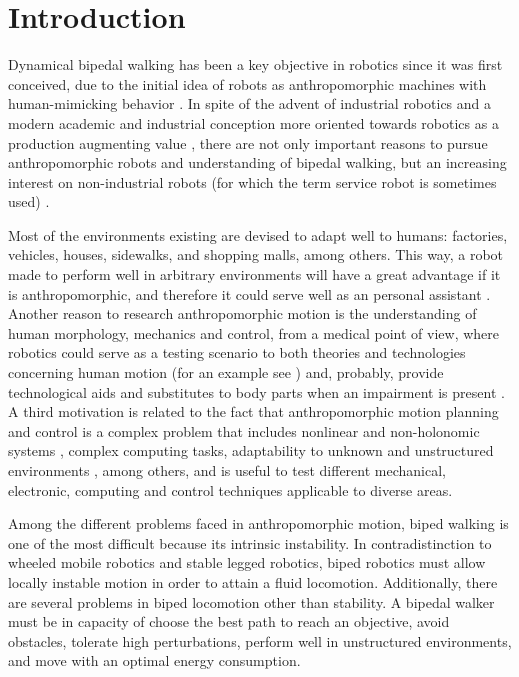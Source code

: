 \section{Introduction}
Dynamical bipedal walking has been a key objective in robotics since
it was first conceived, due to the initial idea of robots as
anthropomorphic machines with human-mimicking behavior
\cite{Capek3R.U.R.}. In spite of the advent of industrial robotics and
a modern academic and industrial conception more oriented towards
robotics as a production augmenting value \cite{Yonemoto85TECHNOLOGY},
there are not only important reasons to pursue anthropomorphic robots
and understanding of bipedal walking, but an increasing interest on
non-industrial robots (for which the term service robot is sometimes
used) \cite{Asami94Robots}.


Most of the environments existing are devised to adapt well to humans:
factories, vehicles, houses, sidewalks, and shopping malls, among
others. This way, a robot made to perform well in arbitrary
environments will have a great advantage if it is anthropomorphic, and
therefore it could serve well as an personal assistant
\cite{Dario01Humanoids}. Another reason to research anthropomorphic
motion is the understanding of human morphology, mechanics and
control, from a medical point of view, where robotics could serve as a
testing scenario to both theories and technologies concerning human
motion (for an example see \cite{Woo06Biomechanics}) and, probably,
provide technological aids and substitutes to body parts when an
impairment is present \cite{Hermini01Proposal}. A third motivation is
related to the fact that anthropomorphic motion planning and control
is a complex problem that includes nonlinear and non-holonomic systems
\cite{Basdogan96Nonlinear}, complex computing tasks, adaptability to
unknown and unstructured environments \cite{Cheng00Dynamic}, among
others, and is useful to test different mechanical, electronic,
computing and control techniques applicable to diverse areas.


Among the different problems faced in anthropomorphic motion, biped
walking is one of the most difficult because its intrinsic
instability. In contradistinction to wheeled mobile robotics and
stable legged robotics, biped robotics must allow locally instable
motion in order to attain a fluid locomotion. Additionally, there are
several problems in biped locomotion other than stability. A bipedal
walker must be in capacity of choose the best path to reach an
objective, avoid obstacles, tolerate high perturbations, perform well
in unstructured environments, and move with an optimal energy
consumption.


